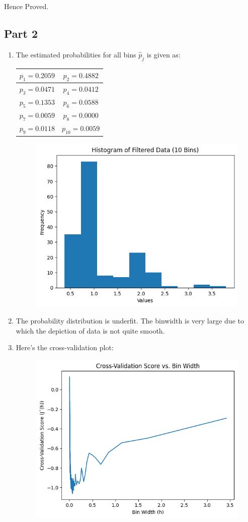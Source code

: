 Hence Proved.
\subsection{Part 2}

\begin{enumerate}[label=(\alph*)]
	\item The estimated probabilities for all bins $\hat{p}_j$ is given as:
	      \begin{center}
		      \begin{tabular}{|c|c|}
			      \hline
			      $p_1 = 0.2059$ & $p_2 = 0.4882$    \\ \hline
			      $p_3 = 0.0471$ & $p_4 = 0.0412$    \\\hline
			      $p_5 = 0.1353$ & $p_6 = 0.0588$    \\\hline
			      $p_7 = 0.0059$ & $p_8 = 0.0000$    \\\hline
			      $p_9 = 0.0118$ & $p_{10} = 0.0059$ \\ \hline
		      \end{tabular}
	      \end{center}
	      \begin{figure}[H]
		      \centering
		      \includegraphics[width=0.7\linewidth]{../images/1/10binhistogram.png}
	      \end{figure}
	\item  The probability distribution is underfit. The binwidth is very large due to which the depiction of data is not quite smooth.
	\item Here's the cross-validation plot:
	      \begin{figure}[H]
		      \centering
		      \includegraphics[width=0.7\linewidth]{../images/1/crossvalidation.png}

\end{figure}
\end{enumerate}
